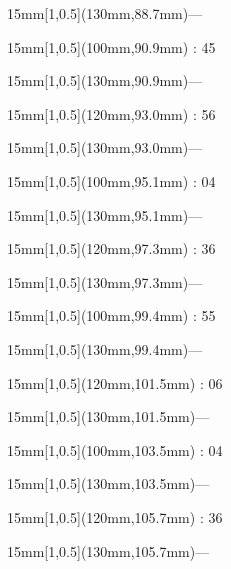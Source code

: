 \documentclass[a4paper]{memoir}
\begin{document}
\begin{textblock*}{15mm}[1,0.5](130mm,88.7mm)\flushright —\end{textblock*}
\begin{textblock*}{15mm}[1,0.5](100mm,90.9mm) : 45\end{textblock*}
\begin{textblock*}{15mm}[1,0.5](130mm,90.9mm)\flushright —\end{textblock*}
\begin{textblock*}{15mm}[1,0.5](120mm,93.0mm) : 56\end{textblock*}
\begin{textblock*}{15mm}[1,0.5](130mm,93.0mm)\flushright —\end{textblock*}
\begin{textblock*}{15mm}[1,0.5](100mm,95.1mm) : 04\end{textblock*}
\begin{textblock*}{15mm}[1,0.5](130mm,95.1mm)\flushright —\end{textblock*}
\begin{textblock*}{15mm}[1,0.5](120mm,97.3mm) : 36\end{textblock*}
\begin{textblock*}{15mm}[1,0.5](130mm,97.3mm)\flushright —\end{textblock*}
\begin{textblock*}{15mm}[1,0.5](100mm,99.4mm) : 55\end{textblock*}
\begin{textblock*}{15mm}[1,0.5](130mm,99.4mm)\flushright —\end{textblock*}
\begin{textblock*}{15mm}[1,0.5](120mm,101.5mm) : 06\end{textblock*}
\begin{textblock*}{15mm}[1,0.5](130mm,101.5mm)\flushright —\end{textblock*}
\begin{textblock*}{15mm}[1,0.5](100mm,103.5mm) : 04\end{textblock*}
\begin{textblock*}{15mm}[1,0.5](130mm,103.5mm)\flushright —\end{textblock*}
\begin{textblock*}{15mm}[1,0.5](120mm,105.7mm) : 36\end{textblock*}
\begin{textblock*}{15mm}[1,0.5](130mm,105.7mm)\flushright —\end{textblock*}
\end{document}
